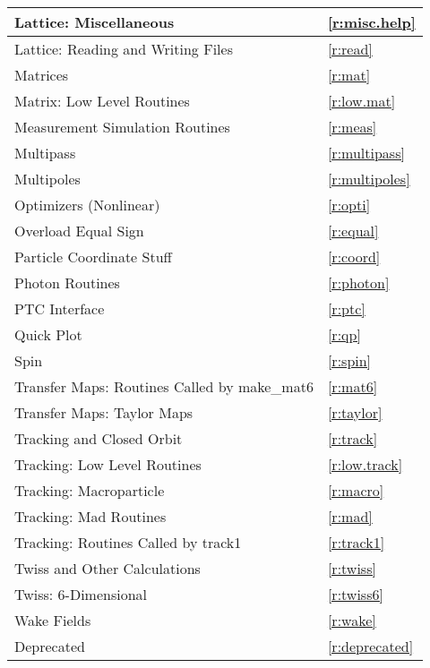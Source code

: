 \begin{center}
\begin{tabular}{|l|l|}
  Lattice: Miscellaneous                      & \ref{r:misc.help}      \\ \hline
  Lattice: Reading and Writing Files          & \ref{r:read}           \\ \hline
  Matrices                                    & \ref{r:mat}            \\ \hline
  Matrix: Low Level Routines                  & \ref{r:low.mat}        \\ \hline
  Measurement Simulation Routines             & \ref{r:meas}           \\ \hline
  Multipass                                   & \ref{r:multipass}      \\ \hline
  Multipoles                                  & \ref{r:multipoles}     \\ \hline
  Optimizers (Nonlinear)                      & \ref{r:opti}           \\ \hline
  Overload Equal Sign                         & \ref{r:equal}          \\ \hline
  Particle Coordinate Stuff                   & \ref{r:coord}          \\ \hline
  Photon Routines                             & \ref{r:photon}         \\ \hline
  PTC Interface                               & \ref{r:ptc}            \\ \hline
  Quick Plot                                  & \ref{r:qp}             \\ \hline
  Spin                                        & \ref{r:spin}           \\ \hline
  Transfer Maps: Routines Called by make_mat6 & \ref{r:mat6}           \\ \hline
  Transfer Maps: Taylor Maps                  & \ref{r:taylor}         \\ \hline
  Tracking and Closed Orbit                   & \ref{r:track}          \\ \hline
  Tracking: Low Level Routines                & \ref{r:low.track}      \\ \hline
  Tracking: Macroparticle                     & \ref{r:macro}          \\ \hline
  Tracking: Mad Routines                      & \ref{r:mad}            \\ \hline
  Tracking: Routines Called by track1         & \ref{r:track1}         \\ \hline
  Twiss and Other Calculations                & \ref{r:twiss}          \\ \hline
  Twiss: 6-Dimensional                        & \ref{r:twiss6}         \\ \hline
  Wake Fields                                 & \ref{r:wake}           \\ \hline
  Deprecated                                  & \ref{r:deprecated}     \\ \hline
\end{tabular}
\end{center}
\toffset

